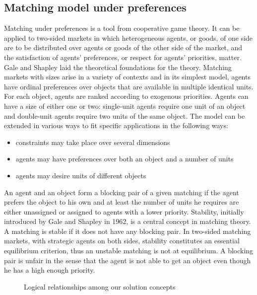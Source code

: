 \subsection{Matching model under preferences}\label{matching-model-under-preferences}%

Matching under preferences is a tool from cooperative game theory. It can be applied to two-sided
markets in which heterogeneous agents, or goods, of one side are to be distributed over agents or
goods of the other side of the market, and the satisfaction of agents’ preferences, or respect for agents’
priorities, matter. Gale and Shapley laid the theoretical foundations for the theory.
Matching markets with sizes arise in a variety of contexts and in its simplest model, agents have ordinal preferences over objects that are available in multiple identical units. For each object, agents
are ranked according to exogenous priorities. Agents can have a size of either one or two:
single-unit agents require one unit of an object and double-unit agents require two units of the
same object. The model can be extended in various ways to fit specific applications in the following ways:
\begin{itemize}
    \item constraints may take place over several dimensions
    \item agents may have preferences over both an object and a number of
    units
    \item agents may desire units of different objects
\end{itemize}
An agent and an object form a blocking pair of a
given matching if the agent prefers the object to his own and at least the number of units he requires are either unassigned or assigned to agents with a lower priority.
Stability, initially introduced by Gale and Shapley in 1962, is a central concept in matching theory. A matching
is stable if it does not have any blocking pair. In two-sided matching markets, with
strategic agents on both sides, stability constitutes an essential equilibrium criterion, thus an unstable matching is not at equilibrium. A blocking pair
is unfair in the sense that the agent is not able to get an object even though he has a high enough priority.
\begin{figure}[!htb]
    \def\svgwidth{\columnwidth}
    
    \caption{Logical relationships among our solution concepts}
    \label{fig:matching}
\end{figure}

